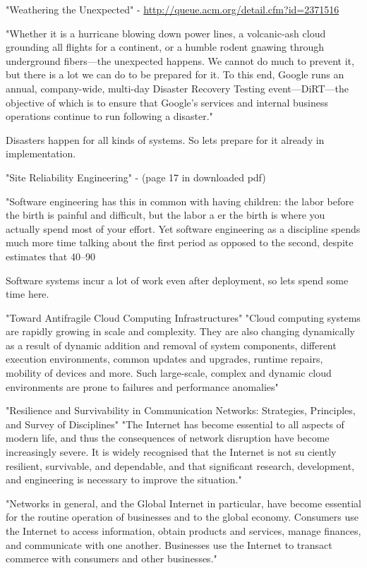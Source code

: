 {"Weathering the Unexpected" - \url{http://queue.acm.org/detail.cfm?id=2371516}

"Whether it is a hurricane blowing down power lines, a volcanic-ash cloud grounding all flights for a continent, or a humble rodent gnawing through underground fibers—the unexpected happens. We cannot do much to prevent it, but there is a lot we can do to be prepared for it. To this end, Google runs an annual, company-wide, multi-day Disaster Recovery Testing event—DiRT—the objective of which is to ensure that Google's services and internal business operations continue to run following a disaster."


Disasters happen for all kinds of systems. So lets prepare for it already in implementation.


"Site Reliability Engineering" - (page 17 in downloaded pdf)

"Software engineering has this in common with having children: the labor before the birth is painful and difficult, but the labor a er the birth is where you actually spend most of your effort. Yet software engineering as a discipline spends much more time talking about the first period as opposed to the second, despite estimates that 40–90%


Software systems incur a lot of work even after deployment, so lets spend some time here.



"Toward Antifragile Cloud Computing Infrastructures"\cite{abid2014toward}
"Cloud computing systems are rapidly growing in scale and complexity. They are also changing dynamically as a result of dynamic addition and removal of system components, different execution environments, common updates and upgrades, runtime repairs, mobility of devices and more. Such large-scale, complex and dynamic cloud environments are prone to failures and performance anomalies"


"Resilience and Survivability in Communication Networks: Strategies, Principles, and Survey of Disciplines"\cite{sterbenz2010resilience}
"The Internet has become essential to all aspects of modern life, and thus the consequences of network disruption have become increasingly severe. It is widely recognised that the Internet is not su ciently resilient, survivable, and dependable, and that significant research, development, and engineering is necessary to improve the situation."

"Networks in general, and the Global Internet in particular, have become essential for the routine operation of businesses and to the global economy. Consumers use the Internet to access information, obtain products and services, manage finances, and communicate with one another. Businesses use the Internet to transact commerce with consumers and other businesses."



}
